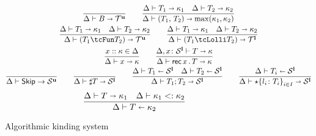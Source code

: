 \begin{figure}[h!]
  \hfill{}
  \begin{gather*}
    \frac{}{\algkindout{\tcBase}{\kindt^\Un}}
    \qquad 
    \frac{
      \algkindout{T_1}{\kind_1}
      \quad
      \algkindout{T_2}{\kind_2}
    }{
      \algkindout{\tPair{T_1}{T_2}}{\max(\kind_1, \kind_2)}
    }
    \\
    \frac{
      \algkindout{T_1}{\kind_1}
      \quad
      \algkindout{T_2}{\kind_2}
    }{
      \algkindout{(\tUnFun{T_1}{T_2})}{\kindt^\Un}
      }
    \qquad
    \frac{
      \algkindout{T_1}{\kind_1}
      \quad
      \algkindout{T_2}{\kind_2}
    }{
      \algkindout{(\tLinFun{T_1}{T_2})}{\kindt^\Lin}
    }
    \\
    \frac{x :: \kind \in \kindEnv}{\algkindout x \kind}
   \qquad
   \frac{
     \algkindout[\kindEnv, x\colon \kinds^\Lin] T \kind
   }{
     \algkindout{\tRec xT}{\kind}
   }
    \\
    \frac{}{\kindEnv \Alg \tskip \rightarrow \kinds^\Un}
    \qquad 
    \frac{}{\algkindout{\tMsg T}{\kinds^\Lin}}
    \qquad
    \frac{
      \algkindin{T_1}{\kinds^\Lin}
      \quad
      \algkindin{T_2}{\kinds^\Lin}
    }{
      \algkindout{\tSemi{T_1}{T_2}}{\kinds^\Lin}
    }
    \qquad
    \frac{
      \algkindin{T_i}{\kinds^\Lin}
    }{
      \algkindout{\tChoice{\{l_i\colon T_i\}}_{i\in I}}{\kinds^\Lin}
    }
  \end{gather*}
  \hfill{}
  \begin{equation*}
    \frac{
      {\Delta} \vdash {T} \shortrightarrow{ \kappa_1}
      \quad
      {\Delta} \vdash {\kappa_1} <: {\kappa_2}
    }{
      {\Delta} \vdash {T} \shortleftarrow {\kappa_2}
    }
  \end{equation*}
  \caption{Algorithmic kinding system}
  \label{fig:kinding-system}
\end{figure}

